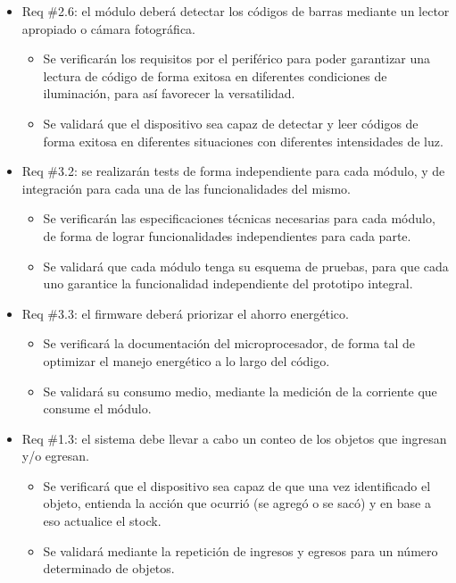 \documentclass[
11pt, %
codirector, %
]{charter}
\begin{document}
\begin{itemize}
\item Req \#2.6: el módulo deberá detectar los códigos de barras mediante un lector apropiado o cámara fotográfica.

\begin{itemize}
	\item Se verificarán los requisitos por el periférico para poder garantizar una lectura de código de forma exitosa en diferentes condiciones de iluminación, para así favorecer la versatilidad.
	\item Se validará que el dispositivo sea capaz de detectar y leer códigos de forma exitosa en diferentes situaciones con diferentes intensidades de luz.
\end{itemize}

\item Req \#3.2: se realizarán tests de forma independiente para cada módulo, y de integración para cada una de las funcionalidades del mismo.

\begin{itemize}
	\item Se verificarán las especificaciones técnicas necesarias para cada módulo, de forma de lograr funcionalidades independientes para cada parte.
	\item Se validará que cada módulo tenga su esquema de pruebas, para que cada uno garantice la funcionalidad independiente del prototipo integral.
\end{itemize}

\item Req \#3.3: el firmware deberá priorizar el ahorro energético.

\begin{itemize}
	\item Se verificará la documentación del microprocesador, de forma tal de optimizar el manejo energético a lo largo del código.
	\item Se validará su consumo medio, mediante la medición de la corriente que consume el módulo.
\end{itemize}

\item Req \#1.3: el sistema debe llevar a cabo un conteo de los objetos que ingresan y/o egresan.

\begin{itemize}
	\item Se verificará que el dispositivo sea capaz de que una vez identificado el objeto, entienda la acción que ocurrió (se agregó o se sacó) y en base a eso actualice el stock.
	\item Se validará mediante la repetición de ingresos y egresos para un número determinado de objetos.
\end{itemize}


\end{itemize}
\end{document}
